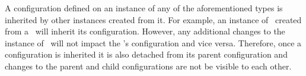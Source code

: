 A configuration defined on an instance of any of the aforementioned types is inherited by other instances created from it. For example, an instance of \Target\ created from a \Client\ will inherit its configuration. However, any additional changes to the instance of \Target\ will not impact the \Client's configuration and vice versa. Therefore, once a configuration is inherited it is also detached from its parent configuration and changes to the parent and child configurations are not be visible to each other.









